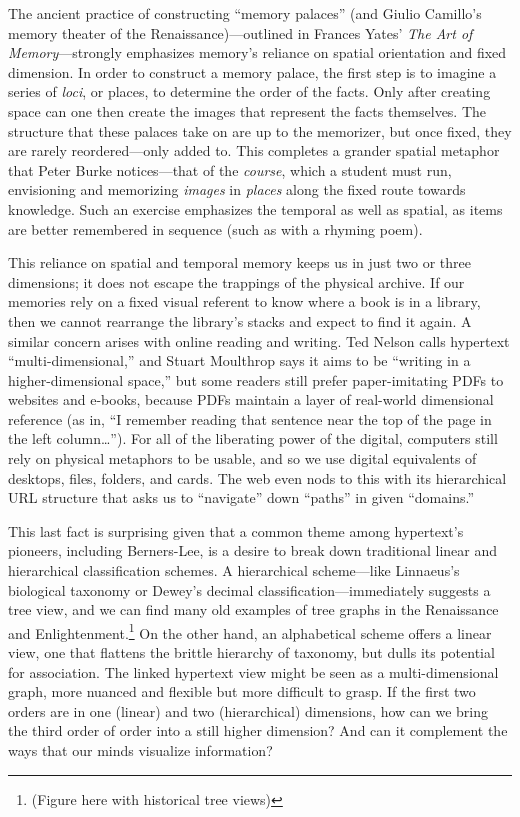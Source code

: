 The ancient practice of constructing ``memory palaces'' (and Giulio Camillo's memory theater of the Renaissance)---outlined in Frances Yates' \emph{The Art of Memory}---strongly emphasizes memory's reliance on spatial orientation and fixed dimension.\autocite{yates_art_1966} In order to construct a memory palace, the first step is to imagine a series of \emph{loci}, or places, to determine the order of the facts. Only after creating space can one then create the images that represent the facts themselves. The structure that these palaces take on are up to the memorizer, but once fixed, they are rarely reordered---only added to. This completes a grander spatial metaphor that Peter Burke notices---that of the \emph{course}, which a student must run, envisioning and memorizing \emph{images} in \emph{places} along the fixed route towards knowledge.\autocite[90]{burke_social_2000} Such an exercise emphasizes the temporal as well as spatial, as items are better remembered in sequence (such as with a rhyming poem).

This reliance on spatial and temporal memory keeps us in just two or three dimensions; it does not escape the trappings of the physical archive. If our memories rely on a fixed visual referent to know where a book is in a library, then we cannot rearrange the library's stacks and expect to find it again. A similar concern arises with online reading and writing. Ted Nelson calls hypertext ``multi-dimensional,'' and Stuart Moulthrop says it aims to be ``writing in a higher-dimensional space,''\autocite{barnet_mandelbrot_2013} but some readers still prefer paper-imitating PDFs to websites and e-books, because PDFs maintain a layer of real-world dimensional reference (as in, ``I remember reading that sentence near the top of the page in the left column\ldots''). For all of the liberating power of the digital, computers still rely on physical metaphors to be usable, and so we use digital equivalents of desktops, files, folders, and cards. The web even nods to this with its hierarchical URL structure that asks us to ``navigate'' down ``paths'' in given ``domains.''

This last fact is surprising given that a common theme among hypertext's pioneers, including Berners-Lee, is a desire to break down traditional linear and hierarchical classification schemes. A hierarchical scheme---like Linnaeus's biological taxonomy or Dewey's decimal classification---immediately suggests a tree view, and we can find many old examples of tree graphs in the Renaissance and Enlightenment.\footnote{(Figure here with historical tree views)} On the other hand, an alphabetical scheme offers a linear view, one that flattens the brittle hierarchy of taxonomy, but dulls its potential for association. The linked hypertext view might be seen as a multi-dimensional graph, more nuanced and flexible but more difficult to grasp. If the first two orders are in one (linear) and two (hierarchical) dimensions, how can we bring the third order of order into a still higher dimension? And can it complement the ways that our minds visualize information?

